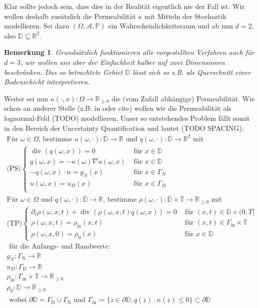 \documentclass[12pt,a4paper]{scrartcl}
\numberwithin{equation}{section}
\newtheorem*{Bemerkung}{Bemerkung}
\newcommand{\R}{\mathbb{R}} %
\DeclareMathOperator{\dive}{div}
\begin{document}
Klar sollte jedoch sein, dass dies in der Realität eigentlich nie der Fall ist.
Wir wollen deshalb zusätzlich die Permeabilität $\kappa$ mit Mitteln der Stochastik modellieren.
Sei dazu $(\Omega, \mathcal{A},\mathbb{P})$ ein Wahrscheinlichkeitsraum und ab nun $d=2$, also $\mathbb{D} \subseteq \R^2$.
\begin{Bemerkung}
	Grundsätzlich funktionieren alle vorgestellten Verfahren auch für $d=3$, wir wollen uns aber der Einfachheit halber auf zwei Dimensionen beschränken. Das so betrachtete Gebiet $\mathbb{D}$ lässt sich so z.B. als Querschnitt einer Bodenschicht interpretieren.
\end{Bemerkung} 
Weiter sei nun $\kappa (\cdot,x): \Omega \rightarrow \R_{\geq0}$ die (vom Zufall abhängige) Permeabilität.
Wie schon an anderer Stelle (z.B. in \cite{kumar2018multigrid} oder cite) wollen wir die Permeabilität als lognormal-Feld (TODO) modellieren.
Unser so entstehendes Problem fällt somit in den Bereich der Uncertainty Quantification und lautet (TODO SPACING): 
\begin{gather*}
\text{Für } \omega \in \Omega \text{, bestimme } u(\omega,\cdot):\overline{\mathbb{D}} \to \R \text{ und } q(\omega, \cdot): \overline{\mathbb{D}} \to \R^2 \text{ mit } \\
	\text{(PS)}
	\begin{cases}
		\dive (q(\omega,x)) = 0  &\text{ für } x \in \mathbb{ D}\\  
		q(\omega,x) = - \kappa(\omega) \nabla u(\omega,x)  &\text{ für } x \in \mathbb{D}\\
		-q(\omega,x) \cdot n = g_N(x)  &\text{ für } x \in \Gamma_N \\
		u(\omega,x) = u_D(x)  &\text{ für } x \in \Gamma_D \\
	\end{cases} \\
	\text{Für } \omega \in \Omega \text{ und }q(\omega,\cdot): \overline{\mathbb{D}} \to \R \text{, bestimme }\rho(\omega,\cdot): \overline{\mathbb{D}} \times \mathbb{T} \to \R_{\geq 0} \text{ mit} \\
	\text{(TP)} 
	\begin{cases}
		\partial_t \rho (\omega, x, t) + \dive(\rho(\omega,x,t)q(\omega,x)) = 0 &\text{ für } (x,t) \in \mathbb{D} \times (0,T] \\
		\rho(\omega,x,t) = \rho_{\text{in}}(x,t) &\text{ für } (x,t) \in \Gamma_{\text{in}} \times \mathbb{T} \\
		\rho(\omega,x,0) = \rho_0(x) &\text{ für } x \in  \mathbb{D}
	\end{cases} \\
\text{ für die Anfangs- und Randwerte: } \\ 
	g_N: \Gamma_{\text{N}} \to \R \\
	u_D: \Gamma_{\text{D}} \to \R \\
	\rho_{\text{in}}: \Gamma_{\text{in}} \times \mathbb{T} \to \R_{\geq0} \\
	\rho_0: \mathbb{D} \to \R_{\geq0} \\
	\text{ wobei } \partial \mathbb{D} = \Gamma_{\text{D}} \dot{\cup} \Gamma_{\text{N}}  \text{ und }  \Gamma_{\text{in}} \coloneqq  \{ z \in \partial \mathbb{D}: q(z)\cdot n(z) \leq 0 \} \subset  \partial \mathbb{D}
\end{gather*}
\end{document}
